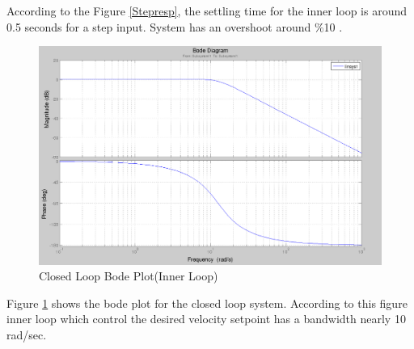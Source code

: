 According to the Figure \ref{Stepresp}, the settling time for the inner loop is around 0.5 seconds for a step input. System has an overshoot around $\%$10 .

\begin{figure}[H]
\caption{Closed Loop Bode Plot(Inner Loop)} \label{ClosedLoop}
\centering
\includegraphics[scale = 0.30]{closed_loop}
\end{figure}

Figure \ref{ClosedLoop} shows the bode plot for the closed loop system. According to this figure inner loop which control the desired velocity setpoint has a bandwidth nearly 10 rad/sec.